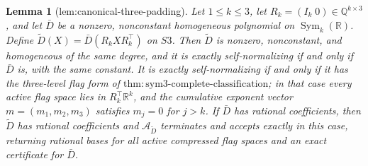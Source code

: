 \documentclass{article}
\newtheorem{lemma}{Lemma}
\begin{document}
\begin{lemma}[lem:canonical-three-padding]\label{lem:canonical-three-padding}
Let \(1\leq k\leq3\), let
\(R_k=(I_k\;0)\in\mathbb Q^{k\times3}\), and let \(\bar D\) be a
nonzero, nonconstant homogeneous polynomial on
\(\operatorname{Sym}_k(\mathbb R)\).  Define
\(\widetilde D(X)=\bar D(R_kXR_k^{\top})\) on \(S3\).  Then
\(\widetilde D\) is nonzero, nonconstant, and homogeneous of the same
degree, and it is exactly self-normalizing if and only if \(\bar D\) is,
with the same constant.  It is exactly self-normalizing if and only if
it has the three-level flag form of
\(\mathrm{thm{:}sym3\text{-}complete\text{-}classification}\); in that
case every active flag space lies in
\(R_k^{\top}\mathbb R^k\), and the cumulative exponent vector
\(m=(m_1,m_2,m_3)\) satisfies \(m_j=0\) for \(j>k\).  If \(\bar D\)
has rational coefficients, then \(\widetilde D\) has rational
coefficients and \(\mathcal A_{\widetilde D}\) terminates and accepts
exactly in this case, returning rational bases for all active compressed
flag spaces and an exact certificate for \(\bar D\).
\end{lemma}
\end{document}
